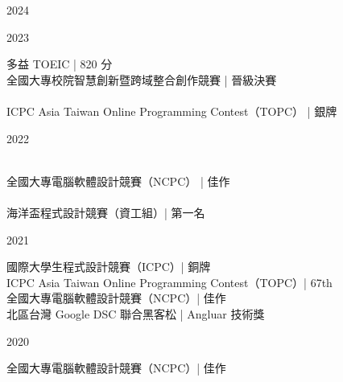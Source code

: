 
\noindent
\begin{minipage}[t]{0.055\textwidth}
  2024
\end{minipage}
\hfill\vline\hfill
\begin{minipage}[t]{0.9\textwidth}
\end{minipage}

\noindent
\begin{minipage}[t]{0.055\textwidth}
  2023
\end{minipage}
\hfill\vline\hfill
\begin{minipage}[t]{0.9\textwidth}
  多益 TOEIC | 820 分 \\
  全國大專校院智慧創新暨跨域整合創作競賽 | 晉級決賽 \\
   \\
  ICPC Asia Taiwan Online Programming Contest（TOPC） | 銀牌
\end{minipage}

\noindent
\begin{minipage}[t]{0.055\textwidth}
  2022
\end{minipage}
\hfill\vline\hfill
\begin{minipage}[t]{0.9\textwidth}
  \\
  全國大專電腦軟體設計競賽（NCPC） | 佳作\\
  \\
  海洋盃程式設計競賽（資工組）| 第一名
\end{minipage}

\noindent
\begin{minipage}[t]{0.055\textwidth}
  2021
\end{minipage}
\hfill\vline\hfill
\begin{minipage}[t]{0.9\textwidth}
  國際大學生程式設計競賽（ICPC）| 銅牌\\
  ICPC Asia Taiwan Online Programming Contest（TOPC）| 67th\\
  全國大專電腦軟體設計競賽（NCPC）| 佳作\\
  北區台灣 Google DSC 聯合黑客松 | Angluar 技術獎
\end{minipage}

\noindent
\begin{minipage}[t]{0.055\textwidth}
  2020
\end{minipage}
\hfill\vline\hfill
\begin{minipage}[t]{0.9\textwidth}
  全國大專電腦軟體設計競賽（NCPC）| 佳作
\end{minipage}

